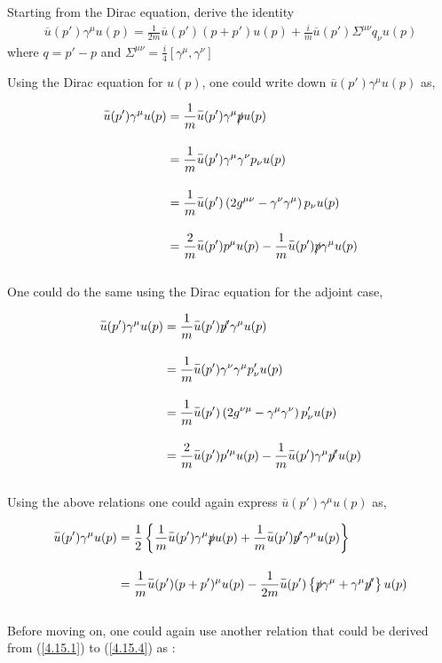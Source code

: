 \begin{problem}{4.15}
Starting from the Dirac equation, derive the identity
\begin{align*}
    \overbar{u}  (p') \gamma^\mu u ( p ) = \frac{1}{2m} \overbar{u}(p') \left(p+p'\right) u(p) + \frac{i}{m} \overbar{u}\left(p'\right) \Sigma^{\mu\nu} q_\nu u(p)
\end{align*}
where $q = p'-p$ and $\Sigma^{\mu\nu}=\frac{i}{4}\left[ \gamma^\mu,\gamma^\nu \right]$
\end{problem}
\begin{solution}
Using the Dirac equation for $u(p)$, one could write down $\overbar{u}(p')\gamma^\mu u(p)$ as,

\begin{align}
    \overbar{u}(p')\gamma^\mu u(p) &= \frac{1}{m}  \overbar{u}(p')\gamma^\mu \slashed{p} u(p)  \label{4.15.1} \\[0.15in]
                                   &= \frac{1}{m}  \overbar{u}(p')\gamma^\mu \gamma^\nu p_\nu u(p) \nonumber \\[0.15in]
                                   &= \frac{1}{m}  \overbar{u}(p')\left( 2g^{\mu\nu} - \gamma^\nu \gamma^\mu \right) p_\nu u(p) \nonumber \\[0.15in]
                                   &= \frac{2}{m}  \overbar{u}(p') p^\mu  u(p) - \frac{1}{m}  \overbar{u}(p') \slashed{p} \gamma^\mu   u(p)    \label{4.15.2}
\end{align}\\
One could do the same using the Dirac equation for the adjoint case,

\begin{align}
    \overbar{u}(p')\gamma^\mu u(p) &= \frac{1}{m}  \overbar{u}(p')  \slashed{p'} \gamma^\mu u(p)  \label{4.15.3} \\[0.15in]
                                   &= \frac{1}{m}  \overbar{u}(p')\gamma^\nu \gamma^\mu p'_\nu u(p) \nonumber \\[0.15in]
                                   &= \frac{1}{m}  \overbar{u}(p')\left( 2g^{\nu\mu} - \gamma^\mu \gamma^\nu \right) p'_\nu u(p) \nonumber \\[0.15in]
                                   &= \frac{2}{m}  \overbar{u}(p') p'^\mu  u(p) - \frac{1}{m}  \overbar{u}(p') \gamma^\mu   \slashed{p'} u(p)   \label{4.15.4}
\end{align}\\
Using the above relations one could again express  $\overbar{u}(p')\gamma^\mu u(p)$ as,

\begin{align}
    \overbar{u}(p')\gamma^\mu u(p) &= \frac{1}{2} \left\{ \frac{1}{m}  \overbar{u}(p')\gamma^\mu \slashed{p} u(p)  + \frac{1}{m}  \overbar{u}(p')  \slashed{p'} \gamma^\mu u(p) \right\} \nonumber \\[0.15in]
                                   &= \frac{1}{m}   \overbar{u}(p') (p+p')^\mu  u(p)  - \frac{1}{2m} \overbar{u}(p') \left\{ \slashed{p}\gamma^\mu + \gamma^\mu \slashed{p'} \right\}  u(p) \label{4.15.5}
\end{align}\\
Before moving on, one could again use another relation that could be derived from (\ref{4.15.1}) to (\ref{4.15.4}) as :


\end{solution}
